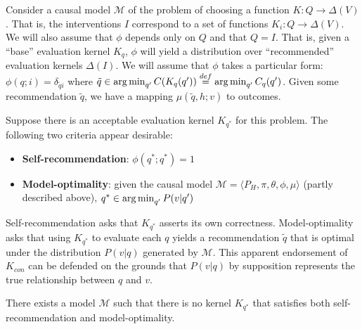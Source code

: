 Consider a causal model $\mathscr{M}$ of the problem of choosing a function $K:Q\to \Delta(V)$. That is, the interventions $I$ correspond to a set of functions $K_i:Q\to \Delta(V)$. We will also assume that $\phi$ depends only on $Q$ and that $Q=I$. That is, given a ``base'' evaluation kernel $K_q$, $\phi$ will yield a distribution over ``recommended'' evaluation kernels $\Delta(I)$. We will assume that $\phi$ takes a particular form: $\phi(q;i) = \delta_{\tilde{q}i}$ where $\tilde{q} \in \operatorname*{arg\,min}_{q'} C(K_q(q'))\overset{def}{=} \operatorname*{arg\,min}_{q'} C_q(q')$. Given some recommendation $\tilde{q}$, we have a mapping $\mu(\tilde{q},h;v)$ to outcomes.

Suppose there is an acceptable evaluation kernel $K_{q^*}$ for this problem. The following two criteria appear desirable:

\begin{itemize}
    \item \textbf{Self-recommendation}: $\phi(q^*;q^*)=1$
    \item \textbf{Model-optimality}: given the causal model $\mathscr{M}=\langle P_H, \pi,\theta,\phi,\mu\rangle$ (partly described above), $q^*\in \operatorname*{arg\,min}_{q'} P(v|q')$
\end{itemize}

Self-recommendation asks that $K_{q^*}$ asserts its own correctness. Model-optimality asks that using $K_{q^*}$ to evaluate each $q$ yields a recommendation $\tilde{q}$ that is optimal under the distribution $P(v|q)$ generated by $\mathscr{M}$. This apparent endorsement of $K_{con}$ can be defended on the grounds that $P(v|q)$ by supposition represents the true relationship between $q$ and $v$.

\begin{theorem}
There exists a model $\mathcal{M}$ such that there is no kernel $K_{q^*}$ that satisfies both self-recommendation and model-optimality.
\end{theorem}

